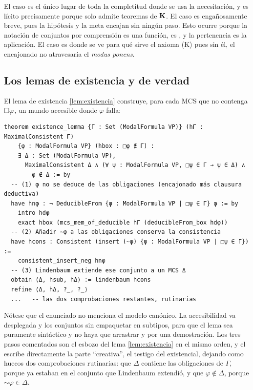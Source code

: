 El caso  es el único lugar de toda la completitud donde se usa la necesitación, y es lícito precisamente porque  solo admite teoremas de $\mathbf{K}$. El caso  es engañosamente breve, pues la hipótesis y la meta encajan sin ningún paso. Esto ocurre porque la notación de conjuntos por comprensión es una función,  es , y la pertenencia es la aplicación. El caso  es donde se ve para qué sirve el axioma (K) pues sin él, el encajonado no atravesaría el \emph{modus ponens}.

\subsection{Los lemas de existencia y de verdad}\label{subsec:comp-ver}

El lema de existencia \ref{lem:existencia} construye, para cada MCS que no contenga $\square\varphi$, un mundo accesible donde $\varphi$ falla:

\begin{lstlisting}
theorem existence_lemma {Γ : Set (ModalFormula VP)} (hΓ : MaximalConsistent Γ)
    {φ : ModalFormula VP} (hbox : □φ ∉ Γ) :
    ∃ Δ : Set (ModalFormula VP),
      MaximalConsistent Δ ∧ (∀ ψ : ModalFormula VP, □ψ ∈ Γ → ψ ∈ Δ) ∧
        φ ∉ Δ := by
  -- (1) φ no se deduce de las obligaciones (encajonado más clausura deductiva)
  have hnφ : ¬ DeducibleFrom {ψ : ModalFormula VP | □ψ ∈ Γ} φ := by
    intro hdφ
    exact hbox (mcs_mem_of_deducible hΓ (deducibleFrom_box hdφ))
  -- (2) Añadir ∼φ a las obligaciones conserva la consistencia
  have hcons : Consistent (insert (∼φ) {ψ : ModalFormula VP | □ψ ∈ Γ}) :=
    consistent_insert_neg hnφ
  -- (3) Lindenbaum extiende ese conjunto a un MCS Δ
  obtain ⟨Δ, hsub, hΔ⟩ := lindenbaum hcons
  refine ⟨Δ, hΔ, ?_, ?_⟩
  ...   -- las dos comprobaciones restantes, rutinarias
\end{lstlisting}

Nótese que el enunciado no menciona el modelo canónico. La accesibilidad va desplegada y los conjuntos sin empaquetar en subtipos, para que el lema sea puramente sintáctico y no haya que arrastrar  y  por una demostración. Los tres pasos comentados son el esbozo del lema \ref{lem:existencia} en el mismo orden, y el  escribe directamente la parte ``creativa'', el testigo del existencial, dejando como huecos dos comprobaciones rutinarias: que $\Delta$ contiene las obligaciones de $\Gamma$, porque ya estaban en el conjunto que Lindenbaum extendió, y que $\varphi \notin \Delta$, porque $\mathord{\sim}\varphi \in \Delta$.

